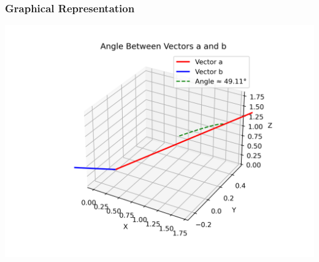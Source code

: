 \documentclass{beamer}
\begin{document}
\begin{frame}
\frametitle{Graphical Representation}
\begin{center}
\includegraphics[width=0.8\linewidth]{fig1.png}
\end{center}
\end{frame}
\end{document}
